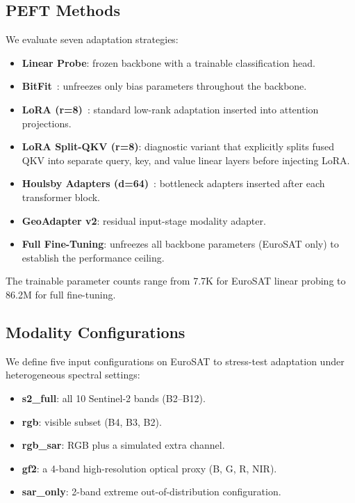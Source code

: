 \documentclass[11pt]{article}
\begin{document}
\subsection{PEFT Methods}
We evaluate seven adaptation strategies:
\begin{itemize}[leftmargin=1.5em]
    \item \textbf{Linear Probe}: frozen backbone with a trainable classification head.
    \item \textbf{BitFit}~\cite{zaken2022bitfit}: unfreezes only bias parameters throughout the backbone.
    \item \textbf{LoRA (r=8)}~\cite{hu2022lora}: standard low-rank adaptation inserted into attention projections.
    \item \textbf{LoRA Split-QKV (r=8)}: diagnostic variant that explicitly splits fused QKV into separate query, key, and value linear layers before injecting LoRA.
    \item \textbf{Houlsby Adapters (d=64)}~\cite{houlsby2019adapter}: bottleneck adapters inserted after each transformer block.
    \item \textbf{GeoAdapter v2}: residual input-stage modality adapter.
    \item \textbf{Full Fine-Tuning}: unfreezes all backbone parameters (EuroSAT only) to establish the performance ceiling.
\end{itemize}

The trainable parameter counts range from 7.7K for EuroSAT linear probing to 86.2M for full fine-tuning.

\subsection{Modality Configurations}
We define five input configurations on EuroSAT to stress-test adaptation under heterogeneous spectral settings:
\begin{itemize}[leftmargin=1.5em]
    \item \textbf{s2\_full}: all 10 Sentinel-2 bands (B2--B12).
    \item \textbf{rgb}: visible subset (B4, B3, B2).
    \item \textbf{rgb\_sar}: RGB plus a simulated extra channel.
    \item \textbf{gf2}: a 4-band high-resolution optical proxy (B, G, R, NIR).
    \item \textbf{sar\_only}: 2-band extreme out-of-distribution configuration.
\end{itemize}
\end{document}
